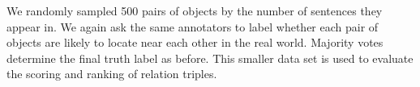 
We randomly sampled 500 pairs of objects by the number of sentences they
appear in. 
We again ask the same annotators to label whether each pair of objects
are likely to locate near each other in the real world. 
Majority votes determine the final truth label as before.
This smaller data set is used to evaluate the 
scoring and ranking of relation triples.
